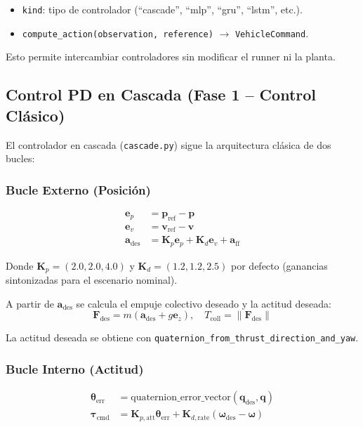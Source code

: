 \documentclass[12pt,a4paper]{article}
\begin{document}
\begin{itemize}
    \item \texttt{kind}: tipo de controlador (``cascade'', ``mlp'', ``gru'', ``lstm'', etc.).
    \item \texttt{compute\_action(observation, reference)} $\to$ \texttt{VehicleCommand}.
\end{itemize}

Esto permite intercambiar controladores sin modificar el runner ni la planta.

\subsection{Control PD en Cascada (Fase 1 -- Control Clásico)}

El controlador en cascada (\texttt{cascade.py}) sigue la arquitectura clásica de dos bucles:

\subsubsection{Bucle Externo (Posición)}
\begin{align}
    \mathbf{e}_p &= \mathbf{p}_{\text{ref}} - \mathbf{p} \\
    \mathbf{e}_v &= \mathbf{v}_{\text{ref}} - \mathbf{v} \\
    \mathbf{a}_{\text{des}} &= \mathbf{K}_p \mathbf{e}_p + \mathbf{K}_d \mathbf{e}_v + \mathbf{a}_{\text{ff}}
\end{align}

Donde $\mathbf{K}_p = (2.0, 2.0, 4.0)$ y $\mathbf{K}_d = (1.2, 1.2, 2.5)$ por defecto (ganancias sintonizadas para el escenario nominal).

A partir de $\mathbf{a}_{\text{des}}$ se calcula el empuje colectivo deseado y la actitud deseada:
\begin{equation}
    \mathbf{F}_{\text{des}} = m (\mathbf{a}_{\text{des}} + g \mathbf{e}_z), \quad
    T_{\text{coll}} = \|\mathbf{F}_{\text{des}}\|
\end{equation}

La actitud deseada se obtiene con \texttt{quaternion\_from\_thrust\_direction\_and\_yaw}.

\subsubsection{Bucle Interno (Actitud)}
\begin{align}
    \boldsymbol{\theta}_{\text{err}} &= \text{quaternion\_error\_vector}(\mathbf{q}_{\text{des}}, \mathbf{q}) \\
    \boldsymbol{\tau}_{\text{cmd}} &= \mathbf{K}_{p,\text{att}} \boldsymbol{\theta}_{\text{err}} + \mathbf{K}_{d,\text{rate}} (\boldsymbol{\omega}_{\text{des}} - \boldsymbol{\omega})
\end{align}
\end{document}
